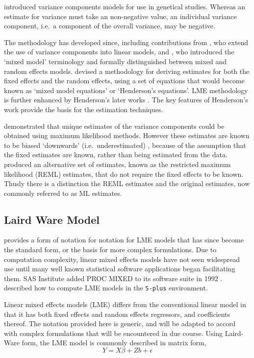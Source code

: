 \documentclass[12pt, a4paper]{report}
\theoremstyle{plain}
\theoremstyle{definition}
\theoremstyle{remark}
\begin{document}
			\citet{Fisher4} introduced variance components models for use in genetical studies. Whereas an estimate for variance must take an non-negative value, an individual variance component, i.e.\ a component of the overall variance, may be negative.
			
			The methodology has developed since, including contributions from
			\citet{tippett}, who extend the use of variance components into linear models, and \citet{eisenhart}, who introduced the `mixed model' terminology and formally distinguished between mixed and random effects models. \citet{Henderson:1950} devised a methodology for deriving estimates for both the fixed effects and the random effects, using a set of equations that would become known as `mixed model equations' or `Henderson's equations'.
			LME methodology is further enhanced by Henderson's later works \citep{Henderson53, Henderson59,Henderson63,Henderson73,Henderson84a}. The key features of Henderson's work provide the basis for the estimation techniques.
			
			\citet{HartleyRao} demonstrated that unique estimates of the variance components could be obtained using maximum likelihood methods. However these estimates are known to be biased `downwards' (i.e.\ underestimated) , because of the assumption that the fixed estimates are known, rather than being estimated from the data. \citet{PattersonThompson} produced an alternative set of estimates, known as the restricted maximum likelihood (REML) estimates, that do not require the fixed effects to be known. Thusly there is a distinction the REML estimates and the original estimates, now commonly referred to as ML estimates.
			
			\subsection{Laird Ware Model} 
			\citet{LW82} provides a form of notation for notation for LME models that has since become the standard form, or the basis for more complex formulations. Due to computation complexity, linear mixed effects models have not seen widespread use until many well known statistical software applications began facilitating them. SAS Institute added PROC MIXED to its software suite in 1992 \citep{singer}. \citet{PB} described how to compute LME models in the \texttt{S-plus} environment.
			
			Linear mixed effects models (LME)
			differs from the conventional linear model in that it has both
			fixed effects and random effects regressors, and coefficients
			thereof. The notation provided here is generic, and will be adapted to accord with complex formulations that will be encountered in due course. Using Laird-Ware form, the LME model is commonly described in matrix form,
			\begin{equation}
			Y = X\beta + Zb + \epsilon
			\label{LW}
			\end{equation}
			
\end{document}
